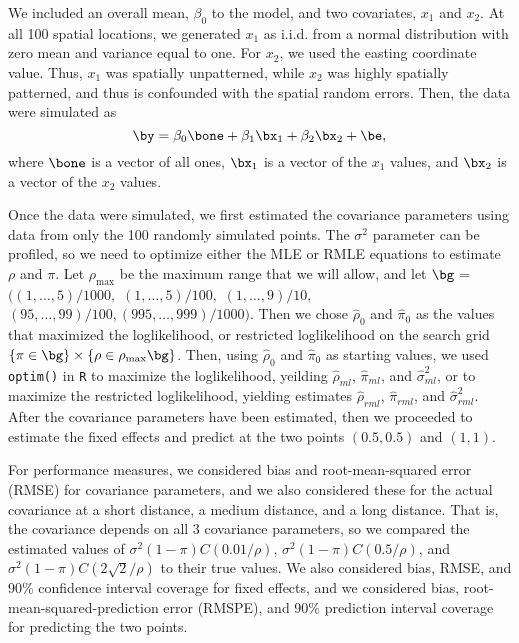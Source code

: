 \documentclass[12pt, titlepage]{article}
\begin{document}
We included an overall mean, $\beta_0$ to the model, and two covariates, $x_1$ and $x_2$.  At all 100 spatial locations, we generated $x_1$ as i.i.d. from a normal distribution with zero mean and variance equal to one.  For $x_2$, we used the easting coordinate value.  Thus, $x_1$ was spatially unpatterned, while $x_2$ was highly spatially patterned, and thus is confounded with the spatial random errors.  Then, the data were simulated as
$$
\by = \beta_0\bone + \beta_1\bx_1 + \beta_2\bx_2 + \be,
$$
where $\bone$ is a vector of all ones, $\bx_1$ is a vector of the $x_1$ values, and $\bx_2$ is a vector of the $x_2$ values.

Once the data were simulated, we first estimated the covariance parameters using data from only the 100 randomly simulated points.  The $\sigma^2$ parameter can be profiled, so we need to optimize either the MLE or RMLE equations to estimate $\rho$ and $\pi$.  Let $\rho_{\textrm{max}}$ be the maximum range that we will allow, and let $\bg$ = $((1,\ldots,5)/1000,$ $(1,\ldots,5)/100,$ $(1,\ldots,9)/10,$ $(95,\ldots,99)/100, (995,\ldots,999)/1000)$.  Then we chose $\hat{\rho}_0$ and $\hat{\pi}_0$ as the values that maximized the loglikelihood, or restricted loglikelihood on the search grid $\{\pi \in \bg\} \times \{\rho \in \rho_{\textrm{max}}\bg\}$. Then, using $\hat{\rho}_0$ and $\hat{\pi}_0$ as starting values, we used \texttt{optim()} in \texttt{R} to maximize the loglikelihood, yeilding $\hat{\rho}_{ml}$, $\hat{\pi}_{ml}$, and $\hat{\sigma}^2_{ml}$, or to maximize the restricted loglikelihood, yielding estimates $\hat{\rho}_{rml}$, $\hat{\pi}_{rml}$, and $\hat{\sigma}^2_{rml}$.  After the covariance parameters have been estimated, then we proceeded to estimate the fixed effects and predict at the two points $(0.5,0.5)$ and $(1,1)$.

For performance measures, we considered bias and root-mean-squared error (RMSE) for covariance parameters, and we also considered these for the actual covariance at a short distance, a medium distance, and a long distance.  That is, the covariance depends on all 3 covariance parameters, so we compared the estimated values of $\sigma^2(1-\pi)C(0.01/\rho)$, $\sigma^2(1-\pi)C(0.5/\rho)$, and $\sigma^2(1-\pi)C(2\sqrt{2}/\rho)$ to their true values. We also considered bias, RMSE, and 90\% confidence interval coverage for fixed effects, and we considered bias, root-mean-squared-prediction error (RMSPE), and 90\% prediction interval coverage for predicting the two points.
\end{document}
